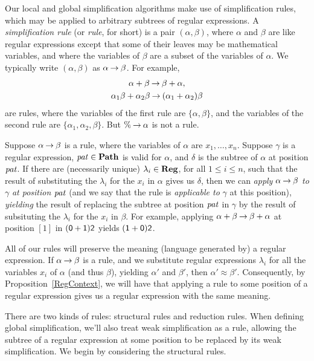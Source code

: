 Our local and global simplification algorithms make use of
simplification rules, which may be applied to arbitrary subtrees of
%
%
regular expressions. A \emph{simplification rule} (or \emph{rule}, for
short) is a pair $(\alpha, \beta)$, where $\alpha$ and $\beta$ are
like regular expressions except that some of their leaves may be
mathematical variables, and where the variables of $\beta$ are a
subset of the variables of $\alpha$. We typically write $(\alpha, \beta)$
as $\alpha\mathbin{\to}\beta$. For example,
\begin{gather*}
\alpha + \beta\mathbin{\to} \beta+\alpha , \\
\alpha_1\beta + \alpha_2\beta \mathbin{\to} (\alpha_1+\alpha_2)\beta
\end{gather*}
are rules, where the variables of the first rule are $\{\alpha,\beta\}$,
and the variables of the second rule are $\{\alpha_1, \alpha_2, \beta\}$.
But $\%\mathbin{\to}\alpha$ is not a rule.

Suppose $\alpha\mathbin{\to}\beta$ is a rule, where the variables of $\alpha$
are $x_1,\ldots,x_n$.  Suppose $\gamma$ is a regular expression,
${\it pat}\in\mathbf{Path}$ is valid for $\alpha$, and $\delta$ is the subtree of
$\alpha$ at position ${\it pat}$.  If there are (necessarily unique)
$\lambda_i\in\mathbf{Reg}$, for all $1\leq i\leq n$, such that the result of
substituting the $\lambda_i$ for the $x_i$ in $\alpha$ gives us
$\delta$, then we can \emph{apply} $\alpha\mathbin{\to}\beta$ \emph{to}
%
%
$\gamma$ \emph{at position} ${\it pat}$ (and we say that the rule is
\emph{applicable to} $\gamma$ at this position), \emph{yielding} the
result of replacing the subtree at position ${\it pat}$ in $\gamma$ by the
result of subsituting the $\lambda_i$ for the $x_i$ in $\beta$.  For
example, applying $\alpha+\beta\mathbin{\to}\beta+\alpha$ at position $[1]$ in
$(\mathsf{0} + \mathsf{1})\mathsf{2}$ yields $(\mathsf{1} + \mathsf{0})\mathsf{2}$.

All of our rules will preserve the meaning (language generated by) a
regular expression. If $\alpha\mathbin{\to}\beta$ is a rule, and we substitute
regular expressions $\lambda_i$ for all the variables $x_i$ of
$\alpha$ (and thus $\beta$), yielding $\alpha'$ and $\beta'$, then
$\alpha'\approx\beta'$. Consequently, by Proposition~\ref{RegContext},
we will have that applying a rule to some position of a regular
expression gives us a regular expression with the same meaning.

There are two kinds of rules: structural rules and reduction rules.
When defining global simplification, we'll also treat weak
simplification as a rule, allowing the subtree of a regular expression
at some position to be replaced by its weak simplification.  We begin
by considering the structural rules.

